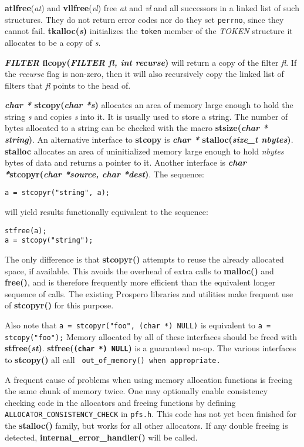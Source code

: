 {\bf atlfree}({\it at}) and {\bf vllfree}({\it vl}) free {\it at} and
{\it vl} and all successors in a linked list of such structures.  They
do not return error codes nor do they set {\tt perrno}, since they
cannot fail.  {\bf tkalloc({\it s})} initializes the {\tt token}
member of the {\it TOKEN} structure it allocates to be a copy of {\it
s}.

{\bf {\it FILTER} flcopy({\it FILTER fl, int recurse})} will return a
copy of the filter {\it fl}.  If the {\it recurse} flag is non-zero,
then it will also recursively copy the linked list of filters that
{\it fl} points to the head of.

{\bf {\it char *} stcopy({\it char *s})} allocates an area of memory
large enough to hold the string {\it s} and copies {\it s} into it.
It is usually used to store a string.  The number of bytes allocated
to a string 
can be checked with the macro {\bf stsize({\it char * string})}.  An
alternative interface to {\bf stcopy} is {\bf {\it char *}
stalloc({\it size\_t nbytes})}.  {\bf stalloc} allocates an area of
uninitialized memory large enough to hold {\it nbytes} bytes of data
and returns a pointer to it.  Another interface is {\bf {\it char
*}stcopyr({\it char *source, char *dest})}.  The sequence:
\begin{verbatim}
a = stcopyr("string", a);
\end{verbatim}
will yield results functionally equivalent to the sequence:
\begin{verbatim}
stfree(a);
a = stcopy("string");
\end{verbatim}
The only
difference is that {\bf stcopyr()} attempts to reuse the already
allocated space, if available.  This avoids the overhead of extra
calls to {\bf malloc()} and {\bf free()}, and is therefore frequently more
efficient than the equivalent longer sequence of calls.  The existing
Prospero libraries and utilities make frequent use of {\bf stcopyr()}
for this purpose.

Also note that \verb|a = stcopyr("foo", (char *) NULL)| is equivalent to 
\verb|a = stcopy("foo");|
Memory allocated by all of these interfaces should be freed with {\bf
stfree({\it st})}.  {\bf stfree({\tt (char *) NULL})} is a guaranteed
no-op.  The various interfaces to {\bf stcopy()} all call {\tt
out\_of\_memory() when appropriate.}  

A frequent cause of problems when using memory allocation functions is
freeing the same chunk of memory twice.  One may optionally enable
consistency checking code in the allocators and freeing functions by
defining {\tt ALLOCATOR\_CONSISTENCY\_CHECK} in {\tt pfs.h}.  This code
has not yet been finished for the {\bf stalloc()} family, but works
for all other allocators.  If any double freeing is detected, {\bf
internal\_error\_handler()} will be called.

